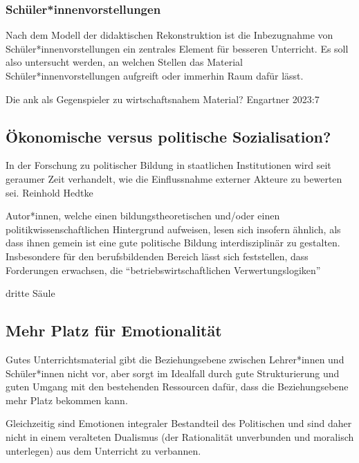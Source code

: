 \subsubsection{Schüler*innenvorstellungen}
Nach dem Modell der didaktischen Rekonstruktion \autocite[]{Reinfried2009} ist die Inbezugnahme von Schüler*innenvorstellungen ein zentrales Element für besseren Unterricht.
Es soll also untersucht werden, an welchen Stellen das Material Schüler*innenvorstellungen aufgreift oder immerhin Raum dafür lässt. 



Die \gls{ank} als Gegenspieler zu wirtschaftsnahem Material? Engartner 2023:7

\subsection{Ökonomische versus politische Sozialisation?}
In der Forschung zu politischer Bildung in staatlichen Institutionen wird seit geraumer Zeit verhandelt, wie die Einflussnahme externer Akteure zu bewerten sei. Reinhold Hedtke 

Autor*innen, welche einen bildungstheoretischen und/oder einen politikwissenschaftlichen Hintergrund aufweisen, lesen sich insofern ähnlich, als dass ihnen gemein ist eine gute politische Bildung interdisziplinär zu gestalten. Insbesondere für den berufsbildenden Bereich lässt sich feststellen, dass Forderungen erwachsen, die \enquote{betriebswirtschaftlichen Verwertungslogiken}

dritte Säule \autocite[]{kerschensteiner1966}


\subsection{Mehr Platz für Emotionalität}
Gutes Unterrichtsmaterial gibt die Beziehungsebene zwischen Lehrer*innen und Schüler*innen nicht vor, aber sorgt im Idealfall durch gute Strukturierung und guten Umgang mit den bestehenden Ressourcen dafür, dass die Beziehungsebene mehr Platz bekommen kann.

Gleichzeitig sind Emotionen integraler Bestandteil des Politischen \autocite{Heidenreich.2012a} und sind daher nicht in einem veralteten Dualismus (der Rationalität unverbunden und moralisch unterlegen) aus dem Unterricht zu verbannen. %

